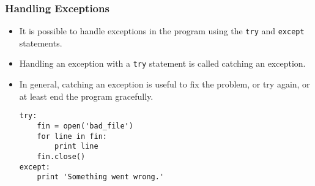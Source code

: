 \documentclass[handout]{beamer}
\newcommand{\beforeverb}{\footnotesize}
\newcommand{\afterverb}{\normalsize}
\begin{document}
\begin{frame}[fragile]
\frametitle{Handling Exceptions}
\begin{itemize}
\item It is possible to handle exceptions in the program using the {\tt try} and {\tt except} statements. 
\item Handling an exception with a {\tt try} statement is called \alert{
catching} an exception.  
\item In general,
catching an exception is useful to fix the problem, or try
again, or at least end the program gracefully.

\beforeverb
\begin{verbatim}
try:    
    fin = open('bad_file')
    for line in fin:
        print line
    fin.close()
except:
    print 'Something went wrong.'
\end{verbatim}
\afterverb
%


\end{itemize}
\end{frame}
\end{document}
